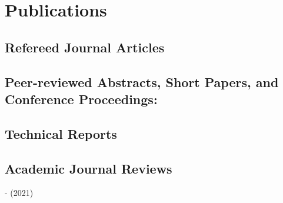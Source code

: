\documentclass[11pt,a4paper,sans]{moderncv}        %
\begin{document}

\section{Publications}
\nocite{*}
\subsection{Refereed Journal Articles}
\printbibliography[heading=none,type=article]

\subsection{Peer-reviewed Abstracts, Short Papers, and Conference Proceedings:}
\printbibliography[heading=none, type=inproceedings]

\subsection{Technical Reports}
\printbibliography[heading=none,type=report]


\subsection{Academic Journal Reviews}

-  (2021)

\end{document}
